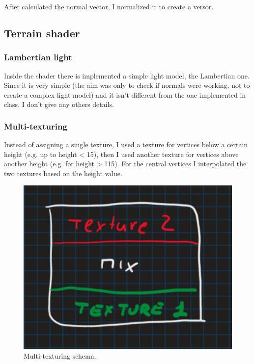 \noindent
After calculated the normal vector, I normalized it to create a versor.

\subsection{Terrain shader}

\subsubsection{Lambertian light}
Inside the shader there is implemented a simple light model, the Lambertian one. Since it is very simple (the aim was only to check if normals were working, not to create a complex light model) and it isn't different from the one implemented in class, I don't give any others details.

\begin{figure}[hbt!]
	\centering
	\qquad
	\caption{}
\end{figure}

\subsubsection{Multi-texturing}
Instead of assigning a single texture, I used a texture for vertices below a certain height (e.g. up to height < 15), then I used another texture for vertices above another height (e.g. for height > 115). For the central vertices I interpolated the two textures based on the height value.

\begin{figure}[hbt!]
	\centering
	\includegraphics[width= 0.45
	\textwidth]{images/textureSchema.jpg}
	\caption{Multi-texturing schema.}
\end{figure} 

